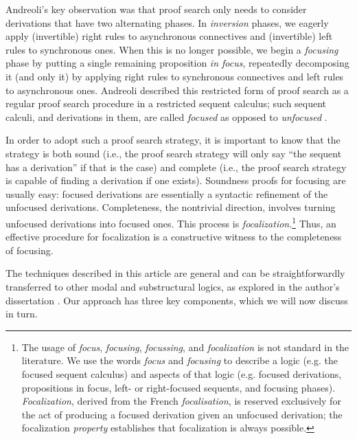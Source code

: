 \documentclass[acmtocl]{robtrans}\pdfoutput=1
\begin{document}
Andreoli's key observation was that proof search only needs to
consider derivations that have two alternating phases.  In {\it
  inversion} phases, we eagerly apply (invertible) right rules to
asynchronous connectives and (invertible) left rules to synchronous
ones. When this is no longer possible, we begin a {\it focusing} phase
by putting a single remaining proposition {\it in focus}, repeatedly
decomposing it (and only it) by applying right rules to synchronous
connectives and left rules to asynchronous ones. Andreoli described
this restricted form of proof search as a regular proof search
procedure in a restricted sequent calculus; such sequent calculi, and
derivations in them, are called {\it focused} as opposed to {\it
  unfocused} \cite{andreoli92logic}.

In order to adopt such a proof search strategy, it is important to
know that the strategy is both sound (i.e., the proof search strategy
will only say ``the sequent has a derivation'' if that is the case)
and complete (i.e., the proof search strategy is capable of finding a
derivation if one exists). Soundness proofs for focusing are usually easy:
focused derivations are essentially a syntactic refinement of the
unfocused derivations.  Completeness, the nontrivial direction,
involves turning unfocused derivations into focused ones. This process
is {\it focalization}.\footnote{The usage of {\it focus}, {\it
    focusing}, {\it focussing}, and {\it focalization} is not standard
  in the literature. We use the words {\it
    focus} and {\it focusing} to describe a logic (e.g. the focused
  sequent calculus) and aspects of that logic (e.g. focused
  derivations, propositions in focus, left- or right-focused sequents,
  and focusing phases).  {\it Focalization}, derived from the French
  {\it focalisation}, is reserved exclusively for the act of producing
  a focused derivation given an unfocused derivation; the focalization
  {\it property} establishes that focalization is always possible.} Thus, an effective procedure for
focalization is a constructive witness to the completeness of
focusing.

The techniques described in this article are general and can be
straightforwardly transferred to other modal and substructural logics,
as explored in the author's dissertation
\cite{simmons12substructural}. Our approach has three key
components, which we will now discuss in turn.
\end{document}
